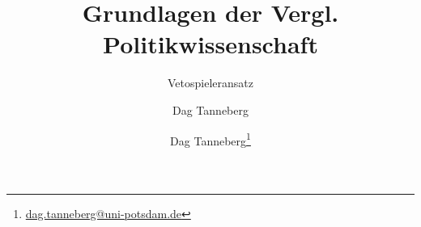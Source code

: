 \usepackage[ngerman]{babel}
\usepackage[utf8]{inputenc}
\usepackage{graphicx}
\usepackage{hyperref}
\usepackage{multirow}
\usepackage{booktabs}
\usepackage{tikz}
  \usetikzlibrary{positioning}
  \usetikzlibrary{calc}
  \usetikzlibrary{matrix}
\usepackage{adjustbox}
\usepackage{tikzscale}
\usepackage{harveyballs}

\author{Dag Tanneberg}
\title{Grundlagen der Vergl. Politikwissenschaft}
\subtitle{Vetospieleransatz}
\author{Dag Tanneberg\thanks{%
  \href{mailto:dag.tanneberg@uni-potsdam.de}%
    {dag.tanneberg@uni-potsdam.de}
  }
}
\hypersetup{colorlinks, urlcolor = red, linkcolor = }
